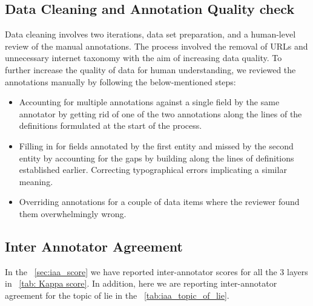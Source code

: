 \subsection{Data Cleaning and Annotation Quality check}\label{sec: data cleaning}
Data cleaning involves two iterations, data set preparation, and a human-level review of the manual annotations. The process involved the removal of URLs and unnecessary internet taxonomy with the aim of increasing data quality. To further increase the quality of data for human understanding, we reviewed the annotations manually by following the below-mentioned steps:
\vspace{-3mm}
\begin{itemize}
\setlength\itemsep{0em}
    \item Accounting for multiple annotations against a single field by the same annotator by getting rid of one of the two annotations along the lines of the definitions formulated at the start of the process.
   
    \item Filling in for fields annotated by the first entity and missed by the second entity by accounting for the gaps by building along the lines of definitions established earlier. 
    Correcting typographical errors implicating a similar meaning.
    
    \item Overriding annotations for a couple of data items where the reviewer found them overwhelmingly wrong.
\end{itemize}
\vspace{-3mm}

\subsection{Inter Annotator Agreement
}\label{sec: Data Annotation}
In the ~\cref{sec:iaa_score} we have reported inter-annotator scores for all the 3 layers in ~\cref{tab: Kappa score}. In addition, here we are reporting inter-annotator agreement for the topic of lie in the ~\cref{tab:iaa_topic_of_lie}.

\begin{table}[!tbh]
\centering
{}
\label{tab:iaa_topic_of_lie}
\caption{Inter Annotator Agreement score for Topic of Lies.}
\end{table}


